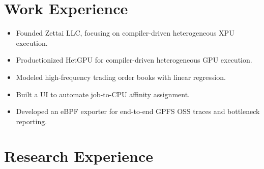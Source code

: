 \documentclass{resume}
\newcommand{\en}[1]{#1}
\newcommand{\zh}[1]{}
\begin{document}
\section{\en{Work Experience}\zh{工作经历}}
\en{}
\zh{\datedsubsection{\textbf{\href{https://zettai.us/}{Zettai有限责任公司}}}{2025/09 -- 现在}}
\en{}
\zh{\role{创始人}{创始人}}
\begin{itemize}
      \item \en{Founded Zettai LLC, focusing on compiler-driven heterogeneous XPU execution.}
            \zh{创立zettai有限责任公司，专注于编译器驱动的异构XPU执行。}
\end{itemize}
\en{}
\zh{\datedsubsection{\textbf{\href{https://oxmiq.ai/}{Oxmiq实验室}}}{2025/06 -- 2025/09}}
\en{}
\zh{\role{编译器工程师}{编译器实习生}}
\begin{itemize}
      \item \en{Productionized HetGPU for compiler-driven heterogeneous GPU execution.}
            \zh{将HetGPU应用于生产环境。}
\end{itemize}
\en{}
\zh{\datedsubsection{\textbf{\href{https://www.jumptrading.com/}{跃申有限公司}}}{2020/07 -- 2020/09}}
\en{}
\zh{\role{Linux 组}{HPC自动化运维实习}}
\begin{itemize}
      \item \en{Modeled high-frequency trading order books with linear regression.}
            \zh{应用线性回归法进行高频交易盘账模拟。}
      \item \en{Built a UI to automate job-to-CPU affinity assignment.}
            \zh{在Linux中自动调度作业集成分配cpu核心绑定功能。}
      \item \en{Developed an eBPF exporter for end-to-end GPFS OSS traces and bottleneck reporting.}
            \zh{应用eBPF的gobinding对GPFS进行io侦测以更好报系统瓶颈。}
\end{itemize}
\section{\en{Research Experience}\zh{研究经历}}
\end{document}

